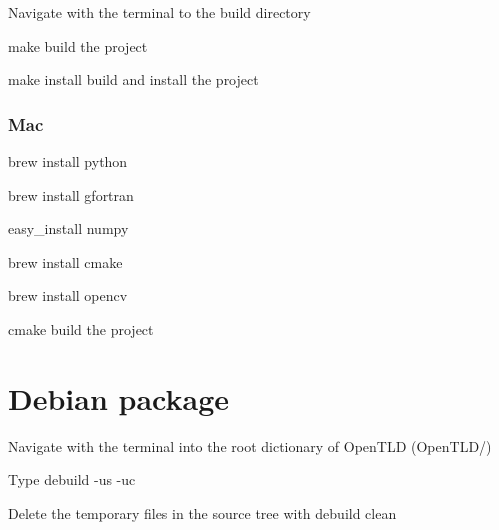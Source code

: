 Navigate with the terminal to the build directory
\begin{DoxyItemize}
\item {\ttfamily make} build the project
\item {\ttfamily make install} build and install the project
\end{DoxyItemize}

\subsubsection*{Mac}


\begin{DoxyItemize}
\item {\ttfamily brew install python}
\item {\ttfamily brew install gfortran}
\item {\ttfamily easy\-\_\-install numpy}
\item {\ttfamily brew install cmake}
\item {\ttfamily brew install opencv}
\item {\ttfamily cmake} build the project
\end{DoxyItemize}

\section*{Debian package}


\begin{DoxyItemize}
\item Navigate with the terminal into the root dictionary of Open\-T\-L\-D (Open\-T\-L\-D/)
\item Type {\ttfamily debuild -\/us -\/uc}
\item Delete the temporary files in the source tree with {\ttfamily debuild clean} 
\end{DoxyItemize}